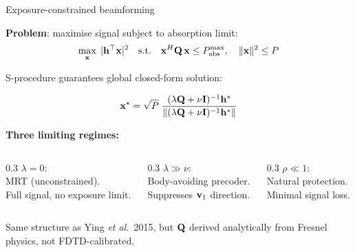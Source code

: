 \begin{frame}{Exposure-constrained beamforming}

  \textbf{Problem}: maximise signal subject to absorption limit:
  \[
    \max_{\mathbf{x}} \;|\mathbf{h}^\top \mathbf{x}|^2
    \quad\text{s.t.}\quad
    \mathbf{x}^H \mathbf{Q}\, \mathbf{x} \le P_{\mathrm{abs}}^{\max},
    \quad \|\mathbf{x}\|^2 \le P
  \]

  \vspace{2pt}
  S-procedure guarantees global closed-form solution:

  \begin{resultbox}
    \vspace{-6pt}
    \[
      \mathbf{x}^\star = \sqrt{P}\;
      \frac{(\lambda\mathbf{Q} + \nu\mathbf{I})^{-1}\mathbf{h}^*}
           {\|(\lambda\mathbf{Q} + \nu\mathbf{I})^{-1}\mathbf{h}^*\|}
    \]
  \end{resultbox}

  \vspace{4pt}
  \textbf{Three limiting regimes:}

  \begin{columns}[T]
    \begin{column}{0.3\textwidth}
      {\small $\lambda = 0$:\\
       MRT (unconstrained).\\
       Full signal, no exposure limit.}
    \end{column}
    \begin{column}{0.3\textwidth}
      {\small $\lambda \gg \nu$:\\
       Body-avoiding precoder.\\
       Suppresses $\mathbf{v}_1$ direction.}
    \end{column}
    \begin{column}{0.3\textwidth}
      {\small $\rho \ll 1$:\\
       Natural protection.\\
       Minimal signal loss.}
    \end{column}
  \end{columns}

  \vspace{6pt}
  {\footnotesize Same structure as Ying \textit{et al.}\ 2015, but $\mathbf{Q}$ derived analytically
   from Fresnel physics, not FDTD-calibrated.}

\end{frame}

